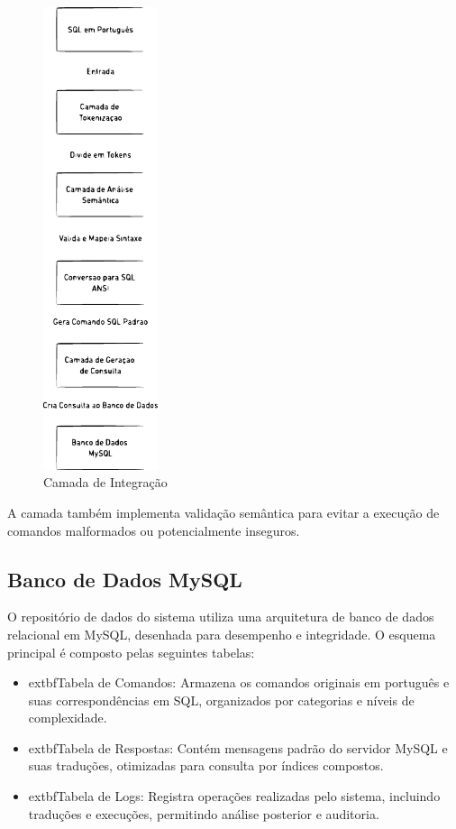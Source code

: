 \begin{figure}
    \centering
    \includegraphics[width=0.3\textwidth]{figuras/traducao.eps}
    \caption{Camada de Integração}
    \label{fig:Camada de tradução}
\end{figure}

A camada também implementa validação semântica para evitar a execução de comandos malformados ou potencialmente inseguros.

\subsection{Banco de Dados MySQL}
O repositório de dados do sistema utiliza uma arquitetura de banco de dados relacional em MySQL, desenhada para desempenho e integridade. O esquema principal é composto pelas seguintes tabelas:

\begin{itemize}
    \item 	extbf{Tabela de Comandos}: Armazena os comandos originais em português e suas correspondências em SQL, organizados por categorias e níveis de complexidade.
    \item 	extbf{Tabela de Respostas}: Contém mensagens padrão do servidor MySQL e suas traduções, otimizadas para consulta por índices compostos.
    \item 	extbf{Tabela de Logs}: Registra operações realizadas pelo sistema, incluindo traduções e execuções, permitindo análise posterior e auditoria.
\end{itemize}

